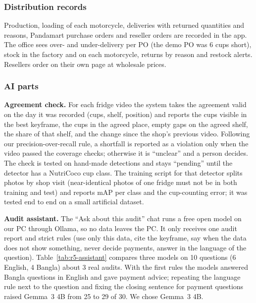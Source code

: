 \subsubsection{Distribution records}
Production, loading of each motorcycle, deliveries with returned quantities and reasons, Pandamart
purchase orders and reseller orders are recorded in the app. The office sees over- and
under-delivery per PO (the demo PO was 6 cups short), stock in the factory and on each motorcycle,
returns by reason and restock alerts. Resellers order on their own page at wholesale prices.

\subsubsection{AI parts}\label{sec:r5-ai}
\textbf{Agreement check.} For each fridge video the system takes the agreement valid on the day it was
recorded (cups, shelf, position) and reports the cups visible in the best keyframe, the cups in the
agreed place, empty gaps on the agreed shelf, the share of that shelf, and the change since the shop's
previous video. Following our precision-over-recall rule, a shortfall is reported as a violation only
when the video passed the coverage checks; otherwise it is ``unclear'' and a person decides. The check
is tested on hand-made detections and stays ``pending'' until the detector has a NutriCoco cup class.
The training script for that detector splits photos by shop visit (near-identical photos of one fridge
must not be in both training and test) and reports mAP per class and the cup-counting error; it was
tested end to end on a small artificial dataset.

\textbf{Audit assistant.} The ``Ask about this audit'' chat runs a free open model on our PC through
Ollama, so no data leaves the PC. It only receives one audit report and strict rules (use only this
data, cite the keyframe, say when the data does not show something, never decide payments, answer in
the language of the question). Table~\ref{tab:r5-assistant} compares three models on 10 questions
(6 English, 4 Bangla) about 3 real audits. With the first rules the models answered Bangla questions in
English and gave payment advice; repeating the language rule next to the question and fixing the
closing sentence for payment questions raised Gemma~3 4B from 25 to 29 of 30. We chose Gemma~3 4B.

